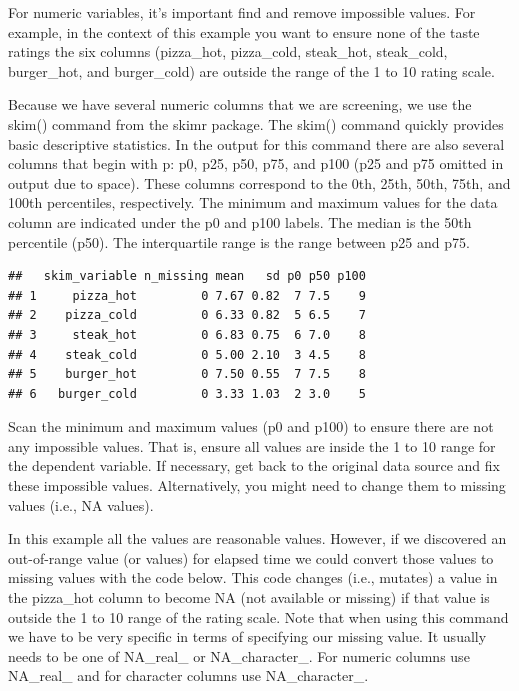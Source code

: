\documentclass[
]{krantz}
\makeatletter
\newenvironment{Shaded}{\begin{snugshade}}{\end{snugshade}}
\newcommand{\KeywordTok}[1]{\textcolor[rgb]{0.27,0.27,0.27}{\textbf{#1}}}
\newcommand{\NormalTok}[1]{#1}
\newcommand{\OperatorTok}[1]{\textcolor[rgb]{0.43,0.43,0.43}{\textbf{#1}}}
\newcommand{\StringTok}[1]{\textcolor[rgb]{0.5,0.5,0.5}{#1}}
\newenvironment{kframe}{%
\medskip{}
\setlength{\fboxsep}{.8em}
 \def\at@end@of@kframe{}%
 \ifinner\ifhmode%
  \def\at@end@of@kframe{\end{minipage}}%
  \begin{minipage}{\columnwidth}%
 \fi\fi%
 \def\FrameCommand##1{\hskip\@totalleftmargin \hskip-\fboxsep
 \colorbox{shadecolor}{##1}\hskip-\fboxsep
     \hskip-\linewidth \hskip-\@totalleftmargin \hskip\columnwidth}%
 \MakeFramed {\advance\hsize-\width
   \@totalleftmargin\z@ \linewidth\hsize
   \@setminipage}}%
 {\par\unskip\endMakeFramed%
 \at@end@of@kframe}
\renewenvironment{Shaded}{\begin{kframe}}{\end{kframe}}
\makeatother
\begin{document}
For numeric variables, it's important find and remove impossible values. For example, in the context of this example you want to ensure none of the taste ratings the six columns (pizza\_hot, pizza\_cold, steak\_hot, steak\_cold, burger\_hot, and burger\_cold) are outside the range of the 1 to 10 rating scale.

Because we have several numeric columns that we are screening, we use the skim() command from the skimr package. The skim() command quickly provides basic descriptive statistics. In the output for this command there are also several columns that begin with p: p0, p25, p50, p75, and p100 (p25 and p75 omitted in output due to space). These columns correspond to the 0th, 25th, 50th, 75th, and 100th percentiles, respectively. The minimum and maximum values for the data column are indicated under the p0 and p100 labels. The median is the 50th percentile (p50). The interquartile range is the range between p25 and p75.

\begin{Shaded}
\end{Shaded}

\begin{verbatim}
##   skim_variable n_missing mean   sd p0 p50 p100
## 1     pizza_hot         0 7.67 0.82  7 7.5    9
## 2    pizza_cold         0 6.33 0.82  5 6.5    7
## 3     steak_hot         0 6.83 0.75  6 7.0    8
## 4    steak_cold         0 5.00 2.10  3 4.5    8
## 5    burger_hot         0 7.50 0.55  7 7.5    8
## 6   burger_cold         0 3.33 1.03  2 3.0    5
\end{verbatim}

Scan the minimum and maximum values (p0 and p100) to ensure there are not any impossible values. That is, ensure all values are inside the 1 to 10 range for the dependent variable. If necessary, get back to the original data source and fix these impossible values. Alternatively, you might need to change them to missing values (i.e., NA values).

In this example all the values are reasonable values. However, if we discovered an out-of-range value (or values) for elapsed time we could convert those values to missing values with the code below. This code changes (i.e., mutates) a value in the pizza\_hot column to become NA (not available or missing) if that value is outside the 1 to 10 range of the rating scale. Note that when using this command we have to be very specific in terms of specifying our missing value. It usually needs to be one of NA\_real\_ or NA\_character\_. For numeric columns use NA\_real\_ and for character columns use NA\_character\_.
\end{document}
